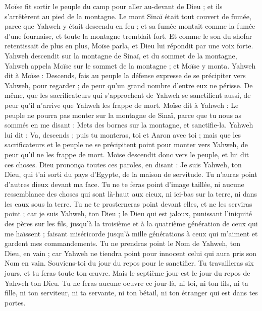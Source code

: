\begin{multicols}{2}
Moïse fit sortir le peuple du camp pour aller au-devant de Dieu ; et ils s'arrêtèrent au pied de la montagne.
Le mont Sinaï était tout couvert de fumée, parce que Yahweh y était descendu en feu ; et sa fumée montait comme la fumée d'une fournaise, et toute la montagne tremblait fort.
Et comme le son du shofar retentissait de plus en plus, Moïse parla, et Dieu lui répondit par une voix forte.
Yahweh descendit sur la montagne de Sinaï, et du sommet de la montagne, Yahweh appela Moïse sur le sommet de la montagne ; et Moïse y monta.
Yahweh dit à Moïse : Descends, fais au peuple la défense expresse de se précipiter vers Yahweh, pour regarder ; de peur qu'un grand nombre d'entre eux ne périsse.
De même, que les sacrificateurs qui s'approchent de Yahweh se sanctifient aussi, de peur qu'il n'arrive que Yahweh les frappe de mort.
Moïse dit à Yahweh : Le peuple ne pourra pas monter sur la montagne de Sinaï, parce que tu nous as sommés en me disant : Mets des bornes sur la montagne, et sanctifie-la.
Yahweh lui dit : Va, descends ; puis tu monteras, toi et Aaron avec toi ; mais que les sacrificateurs et le peuple ne se précipitent point pour monter vers Yahweh, de peur qu’il ne les frappe de mort.
Moïse descendit donc vers le peuple, et lui dit ces choses.
\VerseOne{}Dieu prononça toutes ces paroles, en disant :
Je suis Yahweh, ton Dieu, qui t'ai sorti du pays d'Egypte, de la maison de servitude.
Tu n'auras point d'autres dieux devant ma face.
Tu ne te feras point d'image taillée, ni aucune ressemblance des choses qui sont là-haut aux cieux, ni ici-bas sur la terre, ni dans les eaux sous la terre.
Tu ne te prosterneras point devant elles, et ne les serviras point ; car je suis Yahweh, ton Dieu ; le Dieu qui est jaloux, punissant l'iniquité des pères sur les fils, jusqu'à la troisième et à la quatrième génération de ceux qui me haïssent ;
faisant miséricorde jusqu’à mille générations à ceux qui m'aiment et gardent mes commandements.
Tu ne prendras point le Nom de Yahweh, ton Dieu, en vain ; car Yahweh ne tiendra point pour innocent celui qui aura pris son Nom en vain.
Souviens-toi du jour du repos pour le sanctifier.
Tu travailleras six jours, et tu feras toute ton œuvre.
Mais le septième jour est le jour du repos de Yahweh ton Dieu. Tu ne feras aucune oeuvre ce jour-là, ni toi, ni ton fils, ni ta fille, ni ton serviteur, ni ta servante, ni ton bétail, ni ton étranger qui est dans tes portes.

\end{multicols}

